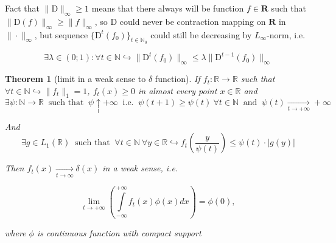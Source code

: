 \documentclass{article}
\newtheorem{theorem}{Theorem}
\begin{document}
    Fact that $\|\text{D}\|_{\infty} \geq 1$ means that there always will be function $f \in \mathbf{R}$ such that $\|\text{D}(f)\|_{\infty} \geq \|f\|_{\infty}$, so $\text{D}$ could never be contraction mapping on $\mathbf{R}$ in $\|\cdot\|_{\infty}$, but sequence $\{\text{D}^t(f_0)\}_{t \in \mathbb{N}_0}$ could still be decreasing by $L_{\infty}$-norm, i.e.

    \begin{equation} \label{derc_inf_norm}
        \exists \lambda \in (0; 1) : \forall t \in \mathbb{N} \hookrightarrow 
        \|\text{D}^t(f_0)\|_{\infty} \leq \lambda \|\text{D}^{t-1}(f_0)\|_{\infty}
    \end{equation}

    \fi

    \begin{theorem}[limit in a weak sense to $\delta$ function] \label{delta}
        If $f_t : \mathbb{R} \to \mathbb{R}$ such that $\forall t \in \mathbb{N} \hookrightarrow  \|f_t\|_1 = 1$, $f_t(x) \geq 0$ in almost every point $x \in \mathbb{R}$ and
        \begin{equation} \label{psi}
            \exists \psi : \mathbb{N} \to \mathbb{R} ~\text{ such that }~ \psi \uparrow +\infty ~\text{ i.e. }~ \psi(t+1) \geq \psi(t) ~\forall t \in \mathbb{N} ~\text{ and }~
            \psi(t) \underset{t \to +\infty}{\longrightarrow} +\infty 
        \end{equation}

        And 
        \begin{equation} \label{g}
            \exists g \in L_1(\mathbb{R}) ~\text{ such that }~ \forall t \in \mathbb{N} ~\forall y \in \mathbb{R} \hookrightarrow f_t\left(\dfrac{y}{\psi(t)}\right) \leq \psi(t) \cdot |g(y)|
        \end{equation}

        Then $f_t(x) \underset{t \to \infty}{\longrightarrow} \delta(x)$ in a weak sense, i.e.

        \begin{equation}
            \underset{t \to +\infty}{\lim}\left(\int\limits_{-\infty}^{+\infty} f_t(x) \phi(x) dx\right) = \phi(0),
        \end{equation}

        where $\phi$ is continuous function with compact support
    \end{theorem}
\end{document}
